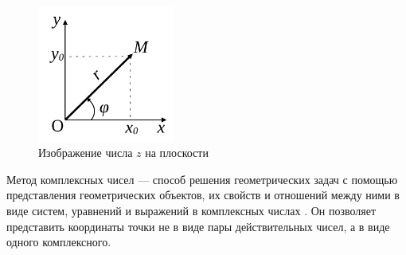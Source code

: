 \begin{figure}[ht]
   \centering
   \includegraphics[width=0.4\textwidth]{images/theory-1.pdf}
   \caption{Изображение числа \(z\) на плоскости}
   \label{theory-1}
\end{figure}
Метод комплексных чисел --- способ решения геометрических задач с помощью представления геометрических объектов,
их свойств и отношений между ними в виде систем, уравнений и выражений в комплексных числах \cite[с. 7]{book:ponarin}.
Он позволяет представить координаты точки не в виде пары
действительных чисел, а в виде одного комплексного.

